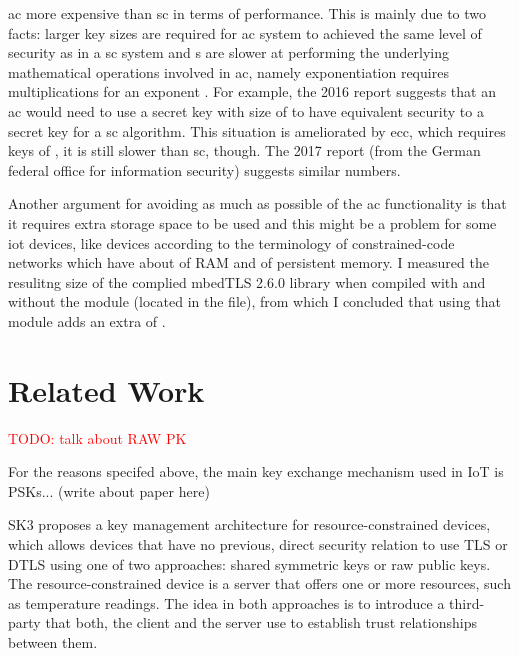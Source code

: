 \documentclass{llncs}
\newcommand{\todo}[1]{\textcolor{red}{TODO: #1}\PackageWarning{TODO:}{#1!}}
\begin{document}
\gls{ac} more expensive than \gls{sc} in terms of performance. This is mainly due
to two facts: larger key sizes are required for \gls{ac} system to achieved the
same level of security as in a \gls{sc} system  and s are slower at performing the underlying
mathematical operations involved in \gls{ac}, namely exponentiation requires
 multiplications for an exponent . For example,
the 2016  report \cite{Recommen44:online}
suggests that an \gls{ac} would need to use a secret key with size of 
to have equivalent security to a  secret key for a \gls{sc} algorithm.
This situation is ameliorated by \gls{ecc}, which requires keys of ,
it is still slower than \gls{sc}, though. The 2017  report \cite{Kryptogr1:online} (from the
German federal office for information security) suggests similar numbers.

Another argument for avoiding as much as possible of the \gls{ac} functionality
is that it requires extra storage space to be used and this might be a problem for some \gls{iot} devices,
like  devices according to the terminology of constrained-code
networks \cite{RFC7228} which have about  of RAM and 
of persistent memory. I measured the resulitng size of the complied mbedTLS 2.6.0 library
\cite{SSLLibra13:online} when compiled with and without the  module
(located in the  file), from which I concluded that using that module adds an
extra of .

\section{Related Work}

\todo{talk about RAW PK}

For the reasons specifed above, the main key exchange mechanism used in IoT
is PSKs... (write about paper here)

SK3\cite{todo} proposes a key management architecture for resource-constrained devices,
which allows devices that have no previous, direct security relation to use
TLS or DTLS using one of two approaches: shared symmetric keys or raw public keys.
The resource-constrained device is a server that offers one or more resources,
such as temperature readings. The idea in both approaches is to introduce a third-party
 that both, the client and the server use to establish
trust relationships between them.
\end{document}
